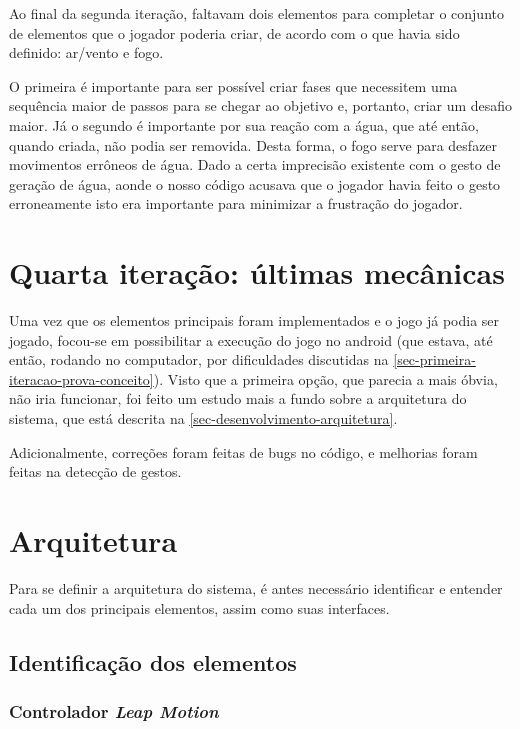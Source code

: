 Ao final da segunda iteração, faltavam dois elementos para
completar o conjunto de elementos que o jogador poderia criar, de acordo
com o que havia sido definido: ar/vento e fogo.

O primeira é importante para ser possível criar fases que necessitem uma 
sequência maior de passos para se chegar ao objetivo e, portanto, criar
um desafio maior. Já o segundo é importante por sua reação com a água, 
que até então, quando criada, não podia ser removida. Desta forma, o 
fogo serve para desfazer movimentos errôneos de água. Dado a certa 
imprecisão existente com o gesto de geração de água, aonde o nosso
código acusava que o jogador havia feito o gesto erroneamente isto era
importante para minimizar a frustração do jogador.

\section{Quarta iteração: últimas mecânicas}\label{sec-quarta-iteracao-integracao}

Uma vez que os elementos principais foram implementados e o jogo já podia
ser jogado, focou-se em possibilitar a execução do jogo no android 
(que estava, até então, rodando no computador, por dificuldades 
discutidas na \autoref{sec-primeira-iteracao-prova-conceito}). Visto que
a primeira opção, que parecia a mais óbvia, não iria funcionar, foi feito um 
estudo mais a fundo sobre a arquitetura do sistema, que está descrita
na \autoref{sec-desenvolvimento-arquitetura}. 

Adicionalmente, correções foram feitas de bugs no código, e melhorias foram
feitas na detecção de gestos.

\section{Arquitetura}\label{sec-desenvolvimento-arquitetura}

Para se definir a arquitetura do sistema, é antes necessário identificar e 
entender cada um dos principais elementos, assim como suas interfaces.

\subsection{Identificação dos elementos}\label{subsec-identificacao-elementos}

\subsubsection{Controlador \textit{Leap Motion}}\label{subsubsec-elemento-leapmotion}

